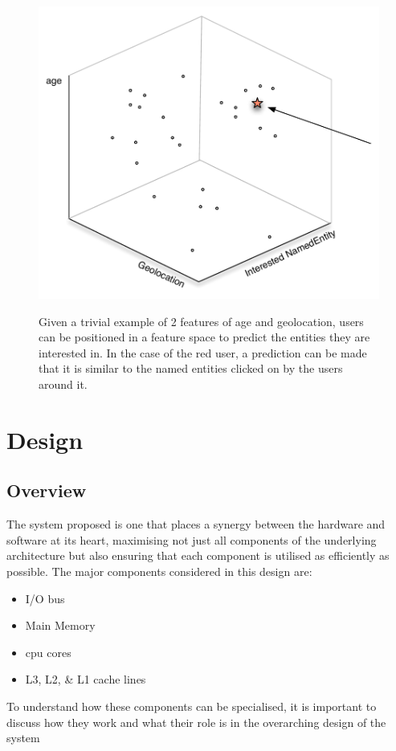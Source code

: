 \documentclass[a4paper,11pt]{scrreprt}
\begin{document}
\begin{figure}[h]
\centering
\caption{Given a trivial example of 2 features of age and geolocation, users can be positioned in a feature space to predict the entities they are interested in. In the case of the red user, a prediction can be made that it is similar to the named entities clicked on by the users around it.}
\includegraphics[scale=0.65, trim=0 10 0 0, clip=true] {featurespace.pdf}
\label{fig:featurespace}
\end{figure}

\chapter{Design}
\section{Overview}
The system proposed is one that places a synergy between the hardware and software at its heart, maximising not just all components of the underlying architecture but also ensuring that each component is utilised as efficiently as possible. The major components considered in this design are:
\begin{itemize}
\item I/O bus
\item Main Memory
\item \acrshort{cpu} cores
\item L3, L2, \& L1 cache lines
\end{itemize}
To understand how these components can be specialised, it is important to discuss how they work and what their role is in the overarching design of the system 
\end{document}
